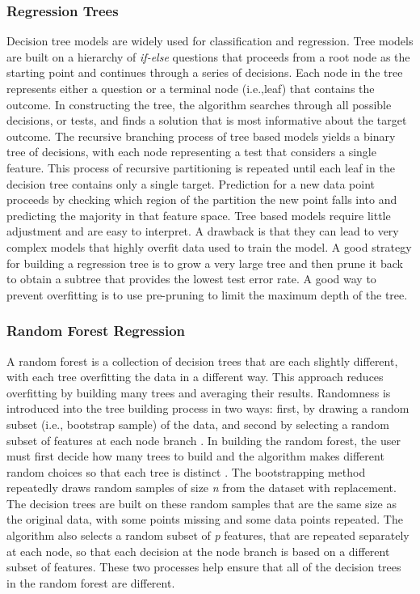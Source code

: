 \documentclass[sigconf]{acmart}
\begin{document}
\subsubsection{Regression Trees}
Decision tree models are widely used for classification and regression. Tree 
models are built on a hierarchy of \textit{if-else} questions that proceeds 
from a root node as the starting point and continues through a series of 
decisions. Each node in the tree represents either a question or a terminal 
node (i.e.,leaf) that contains the outcome. In constructing the tree, the 
algorithm searches through all possible decisions, or tests, and finds a 
solution that is most informative about the target outcome. The recursive 
branching process of tree based models yields a binary tree of decisions, 
with each node representing a test that considers a single feature. This 
process of recursive partitioning is repeated until each leaf in the decision 
tree contains only a single target. Prediction for a new data point proceeds 
by checking which region of the partition the new point falls into and 
predicting the majority in that feature space. Tree based models require 
little adjustment and are easy to interpret. A drawback is that they can lead 
to very complex models that highly overfit data used to train the model. A 
good strategy for building a regression tree is to grow a very large tree 
and then prune it back to obtain a subtree that provides the lowest test error 
rate. A good way to prevent overfitting is to use pre-pruning to limit 
the maximum depth of the tree. 

\subsubsection{Random Forest Regression}

A random forest is a collection of decision trees that are each slightly 
different, with each tree overfitting the data in a different way. This 
approach reduces overfitting by building many trees and averaging their results. 
Randomness is introduced into the tree building process in two ways: first, 
by drawing a random subset (i.e., bootstrap sample) of the data, and second 
by selecting a random subset of features at each node branch \cite{breiman01}. 
In building the random forest, the user must first decide how many trees to 
build and the algorithm makes different random choices so that each tree is
distinct \cite{muller17, raschka17}. The bootstrapping method repeatedly draws 
random samples of size \textit{n} from the dataset with replacement. The 
decision trees are built on these random samples that are the same size as 
the original data, with some points missing and some data points repeated. 
The algorithm also selects a random subset of \textit{p} features, that are 
repeated separately at each node, so that each decision at the node branch is 
based on a different subset of features. These two processes help ensure that 
all of the decision trees in the random forest are different. 
\end{document}
